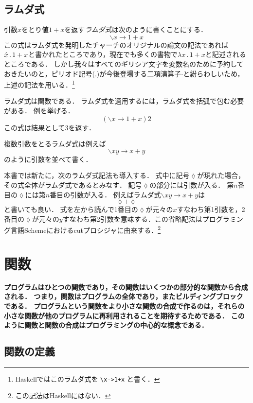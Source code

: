 \documentclass[twocolumn]{jsbook}
\newcommand{\keyword}[1]{\emph{#1}}
\newcommand{\code}[1]{\texttt{#1}}
\newenvironment{leader}{\begingroup\bf}{\endgroup}
\newcommand{\lambdasym}{\backslash}
\newcommand{\lambdadot}{\rightarrow}
\newcommand{\lambdaexp}[2]{\lambdasym#1\lambdadot#2}
\newcommand{\lambdacut}{\lozenge}
\begin{document}
\section{ラムダ式}
引数$x$をとり値$1+x$を返す\keyword{ラムダ式}は次のように書くことにする．
$$\lambdaexp{x}{1+x}$$
この式はラムダ式を発明したチャーチのオリジナルの論文の記法であれば$\Hat x\,.\,1+x$と書かれたところであり，現在でも多くの書物で$\lambda x\,.\,1+x$と記述されるところである．
しかし我々はすべてのギリシア文字を変数名のために予約しておきたいのと，ピリオド記号($.$)が今後登場する二項演算子$\cdot$と紛らわしいため，上述の記法を用いる．\footnote{Haskellではこのラムダ式を \code{\textbackslash x->1+x} と書く．}

ラムダ式は関数である．
ラムダ式を適用するには，ラムダ式を括弧で包む必要がある．
例を挙げる．
$$\left(\lambdaexp{x}{1+x}\right)2$$
この式は結果として$3$を返す．

複数引数をとるラムダ式は例えば$$\lambdaexp{xy}{x+y}$$のように引数を並べて書く．

本書では新たに，次のラムダ式記法も導入する．
式中に記号$\lambdacut$が現れた場合，その式全体がラムダ式であるとみなす．
記号$\lambdacut$の部分には引数が入る．
第$n$番目の$\lambdacut$には第$n$番目の引数が入る．
例えばラムダ式$\lambdaexp{xy}{x+y}$は$$\lambdacut+\lambdacut$$と書いても良い．
式を左から読んで1番目の$\lambdacut$が元々の$x$すなわち第1引数を，2番目の$\lambdacut$が元々の$y$すなわち第2引数を意味する．この省略記法はプログラミング言語Schemeにおけるcutプロシジャに由来する．\footnote{この記法はHaskellにはない．}

\chapter{関数}

\begin{leader}
プログラムはひとつの関数であり，その関数はいくつかの部分的な関数から合成される．
つまり，関数はプログラムの全体であり，またビルディングブロックである．
プログラムという関数をより小さな関数の合成で作るのは，それらの小さな関数が他のプログラムに再利用されることを期待するためである．
このように関数と関数の合成はプログラミングの中心的な概念である．
\end{leader}


\section{関数の定義}
\end{document}
